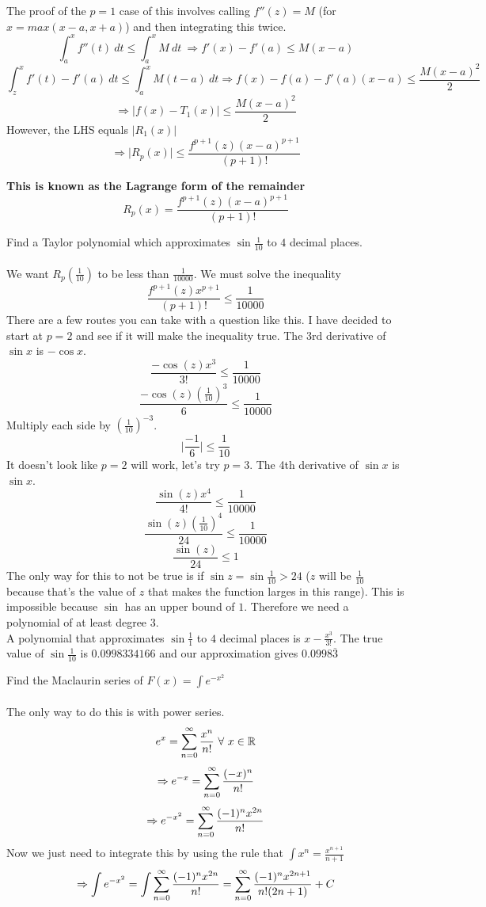 \documentclass[12 pt]{article}
\begin{document}
		The proof of the $p=1$ case of this involves calling $f''(z)=M$ (for $x=max(x-a,x+a)$) and then integrating this twice.
		$$\int_a^x f''(t)\ dt \leq \int_a^x M\ dt\ \Rightarrow f'(x)-f'(a) \leq M(x-a)$$
		$$\int_z^x f'(t)-f'(a)\ dt \leq \int_a^x M(t-a)\ dt \Rightarrow f(x)-f(a)-f'(a)(x-a) \leq \frac{M(x-a)^2}{2}$$
		$$\Rightarrow \lvert f(x)-T_1(x)\rvert \leq \frac{M(x-a)^2}{2}$$
		However, the LHS equals $\lvert R_1(x)\rvert$
		$$\Rightarrow \lvert R_p(x)\rvert \leq \frac{f^{p+1}(z)(x-a)^{p+1}}{(p+1)!}$$

		\begin{center}\textbf{This is known as the Lagrange form of the remainder}
		$$R_p(x)=\frac{f^{p+1}(z)(x-a)^{p+1}}{(p+1)!}$$\end{center}

		\begin{exmp*}
			Find a Taylor polynomial which approximates $\sin{\frac{1}{10}}$ to $4$ decimal places.\\\\
			We want $R_p(\frac{1}{10})$ to be less than $\frac{1}{10000}$. We must solve the inequality
			$$\frac{f^{p+1}(z)x^{p+1}}{(p+1)!} \leq \frac{1}{10000}$$
			There are a few routes you can take with a question like this. I have decided to start at $p=2$ and see if it will make the inequality true. The 3rd derivative of $\sin{x}$ is $-\cos{x}$.
			$$\frac{-\cos{(z)}x^3}{3!} \leq \frac{1}{10000}$$
			$$\frac{-\cos{(z)}(\frac{1}{10})^3}{6} \leq \frac{1}{10000}$$
			Multiply each side by $(\frac{1}{10})^{-3}$.
			$$\lvert\frac{-1}{6}\rvert \leq \frac{1}{10}$$
			It doesn't look like $p=2$ will work, let's try $p=3$. The 4th derivative of $\sin{x}$ is $\sin{x}$.
			$$\frac{\sin{(z)}x^4}{4!} \leq \frac{1}{10000}$$
			$$\frac{\sin{(z)}(\frac{1}{10})^4}{24} \leq \frac{1}{10000}$$
			$$\frac{\sin{(z)}}{24} \leq 1$$
			The only way for this to not be true is if $\sin{z}=\sin{\frac{1}{10}}>24$ ($z$ will be $\frac{1}{10}$ because that's the value of $z$ that makes the function larges in this range). This is impossible because $\sin$ has an upper bound of $1$. Therefore we need a polynomial of at least degree $3$.\\
			A polynomial that approximates $\sin{\frac{1}{1}}$ to $4$ decimal places is $x-\frac{x^3}{3!}$. The true value of $\sin{\frac{1}{10}}$ is $0.0998334166$ and our approximation gives $0.0998\overline{3}$
		\end{exmp*}

		\begin{exmp*}
			Find the Maclaurin series of $F(x)=\int e^{-x^2}$\\\\
			The only way to do this is with power series.
			$$e^x=\sumz \frac{x^n}{n!}\ \forall\ x\in\R$$
			$$\Rightarrow e^{-x}=\sum\limits_{n=0}^{\infty} \frac{(-x)^n}{n!}$$
			$$\Rightarrow e^{-x^2}=\sum\limits_{n=0}^{\infty} \frac{(-1)^nx^{2n}}{n!}$$
			Now we just need to integrate this by using the rule that $\int x^n = \frac{x^{n+1}}{n+1}$
			$$\Rightarrow \int e^{-x^2}=\int \sum\limits_{n=0}^{\infty} \frac{(-1)^nx^{2n}}{n!} = \sum\limits_{n=0}^{\infty} \frac{(-1)^nx^{2n+1}}{n!(2n+1)}+C$$
		\end{exmp*}
\end{document}
